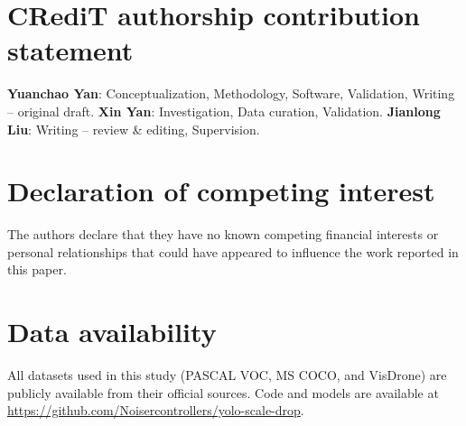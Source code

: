 \documentclass[times,twocolumn,final,authoryear]{elsarticle}
\begin{document}
\section*{CRediT authorship contribution statement}
\textbf{Yuanchao Yan}: Conceptualization, Methodology, Software, Validation, Writing -- original draft. \textbf{Xin Yan}: Investigation, Data curation, Validation. \textbf{Jianlong Liu}: Writing -- review \& editing, Supervision.

\section*{Declaration of competing interest}
The authors declare that they have no known competing financial interests or personal relationships that could have appeared to influence the work reported in this paper.

\section*{Data availability}
All datasets used in this study (PASCAL VOC, MS COCO, and VisDrone) are publicly available from their official sources. Code and models are available at \url{https://github.com/Noisercontrollers/yolo-scale-drop}.



\end{document}
